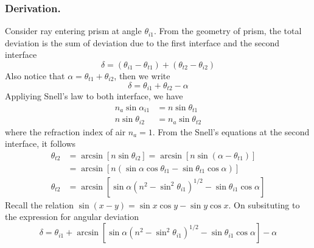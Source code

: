 \documentclass[../../../main.tex]{subfiles}
\begin{document}
\subsubsection*{Derivation.} Consider ray entering prism at angle $\theta_{i1}$. From the geometry of prism, the total deviation is the sum of deviation due to the first interface and the second interface
\begin{equation*}
    \delta=(\theta_{i1}-\theta_{t1})+ (\theta_{t2}-\theta_{i2})
\end{equation*}
Also notice that $\alpha=\theta_{t1}+\theta_{i2}$, then we write
\begin{equation*}
    \delta=\theta_{i1}+\theta_{t2}-\alpha
\end{equation*}
Appliying Snell's law to both interface, we have 
\begin{align*}
    n_a\sin \alpha_{i1}&=n\sin \theta_{t1}\\
    n\sin\theta_{i2}&=n_a\sin \theta_{t2}
\end{align*}
where the refraction index of air $n_a=1$. From the Snell's equations at the second interface, it follows
\begin{align*}
    \theta_{t2}&=\arcsin\left[n\sin \theta_{i2}\right]=\arcsin\left[n\sin (\alpha-\theta_{t1})\right]\\
    &=\arcsin\left[n(\sin \alpha\cos\theta_{t1}-\sin\theta_{t1}\cos \alpha)\right]\\
    \theta_{t2}&=\arcsin\left[\sin \alpha(n^2-\sin^2\theta_{i1})^{1/2}-\sin\theta_{i1}\cos \alpha\right]
\end{align*}
Recall the relation $\sin (x-y)=\sin x\cos y-\sin y\cos x$. On subsituting to the expression for angular deviation
\begin{equation*}
    \delta=\theta_{i1}+\arcsin\left[\sin \alpha(n^2-\sin^2\theta_{i1})^{1/2}-\sin\theta_{i1}\cos \alpha\right]-\alpha
\end{equation*}
\end{document}
